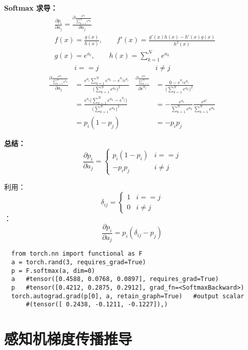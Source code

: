 \noindent\textbf{Softmax 求导：}
\begin{align*}
  &\frac{\partial p_i}{\partial a_j}=\frac{\partial\frac{e^{a_i}}{\sum_{k=1}^{N}e^{a_k}}}{\partial a_j}\\
  &f(x) = \frac{g(x)}{h(x)},~~~~~~~~~f'(x)=\frac{g'(x)h(x)-h'(x)g(x)}{h^2(x)}\\
  &g(x)=e^{a_i},~~~~~~~~~h(x)=\sum_{k=1}^{N}e^{a_k}
\end{align*}
\begin{align*}
  &i==j&&i\neq j\\
  \frac{\partial\frac{e^{a_i}}{\sum_{k=1}^{N}e^{a_k}}}{\partial a_j}&=\frac{e^{a_i} \sum_{k=1}^{N} e^{a_k}-e^{a_j}e^{a_i}}{\big(\sum_{k=1}^{N}e^{a_k}\big)^2}&\frac{\partial\frac{e^{a_i}}{\sum_{k=1}^{N}}}{\partial e^{a_j}}&=\frac{0-e^{a_j}e^{a_i}}{\big(\sum_{k=1}^{N}e^{a_k}\big)^2}\\
  &=\frac{e^{a_i}\big(\sum_{k=1}^{N}e^{a_k}-e^{a_j}\big)}{\big(\sum_{k=1}^{N}e^{a_k}\big)^2}&&=-\frac{e^{a_i}}{\sum_{k=1}^{N}e^{a_k}}\frac{e^{a^j}}{\sum_{k=1}^{N}e^{a_k}}\\
  &=p_i(1-p_j)&&=-p_ip_j
\end{align*}

\textbf{总结：}\\
\begin{equation}\nonumber
\frac{\partial p_i}{\partial a_j}=
\begin{cases}
p_i(1-p_i)& i==j\\
-p_ip_j& i\neq j
\end{cases}
\end{equation}

利用：
\begin{equation}\nonumber
\delta_{ij}=
\begin{cases}
1& i==j\\
0& i\neq j
\end{cases}
\end{equation}
：
$$\frac{\partial p_i}{\partial a_j}=p_i(\delta_{ij}-p_j)$$
\begin{lstlisting}
  from torch.nn import functional as F
  a = torch.rand(3, requires_grad=True)
  p = F.softmax(a, dim=0)
  a   #tensor([0.4588, 0.0768, 0.0897], requires_grad=True)
  p   #tensor([0.4212, 0.2875, 0.2912], grad_fn=<SoftmaxBackward>)
  torch.autograd.grad(p[0], a, retain_graph=True)   #output scalar
      #(tensor([ 0.2438, -0.1211, -0.1227]),)
\end{lstlisting}


\newpage
\section{感知机梯度传播推导}
